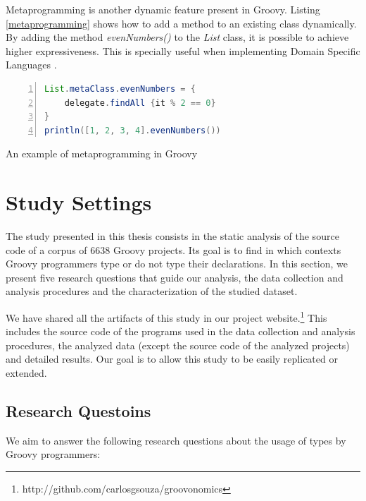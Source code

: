 \documentclass[msc]{ppgccufmg}
\begin{document}
Metaprogramming is another dynamic feature present in Groovy. 
Listing \ref{metaprogramming} shows how to add a method to an existing class dynamically.
By adding the method \emph{evenNumbers()} to the \emph{List} class, it is possible to achieve higher expressiveness.
This is specially useful when implementing Domain Specific Languages \cite{fowler10}.

\begin{Listing}[ht]
\begin{lstlisting}[basicstyle=\ttfamily, language=Java,tabsize=2,breaklines=true,numbers=left]
List.metaClass.evenNumbers = {
	delegate.findAll {it % 2 == 0}
}
println([1, 2, 3, 4].evenNumbers())

\end{lstlisting}
\caption{An example of metaprogramming in Groovy}
\label{metaprogramming}
\end{Listing}%













%
%
\chapter{Study Settings}

The study presented in this thesis consists in the static analysis of the source code of a corpus of 6638 Groovy projects.
Its goal is to find in which contexts Groovy programmers type or do not type their declarations.
In this section, we present five research questions that guide our analysis, the data collection and analysis procedures and the characterization of the studied dataset.

We have shared all the artifacts of this study in our project website.\footnote{http://github.com/carlosgsouza/groovonomics}
This includes the source code of the programs used in the data collection and analysis procedures, the analyzed data (except the source code of the analyzed projects) and detailed results.
Our goal is to allow this study to be easily replicated or extended.

\section{Research Questoins\label{questions}}
We aim to answer the following research questions about the usage of types by Groovy programmers:
\end{document}
